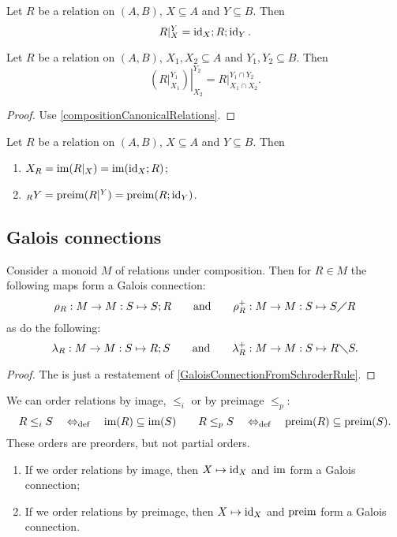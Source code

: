 \begin{lemma}
Let $R$ be a relation on $(A, B)$, $X\subseteq A$ and $Y \subseteq B$. Then
\[ R|^Y_X = \operatorname{id}_X;R;\operatorname{id}_Y. \]
\end{lemma}
\begin{corollary}
Let $R$ be a relation on $(A, B)$, $X_1,X_2\subseteq A$ and $Y_1,Y_2 \subseteq B$. Then
\[ \left.\left(R|_{X_1}^{Y_1}\right)\right|_{X_2}^{Y_2} = R|_{X_1\cap X_2}^{Y_1\cap Y_2}. \]
\end{corollary}
\begin{proof}
Use \ref{compositionCanonicalRelations}.
\end{proof} 

\begin{lemma}
Let $R$ be a relation on $(A,B)$, $X\subseteq A$ and $Y\subseteq B$. Then
\begin{enumerate}
\item $X_R = \operatorname{im}(R|_X) = \operatorname{im}(\operatorname{id}_X;R)$;
\item $_RY = \operatorname{preim}(R|^Y) = \operatorname{preim}(R;\operatorname{id}_Y)$.
\end{enumerate}
\end{lemma}

\subsection{Galois connections}
\begin{proposition}
Consider a monoid $M$ of relations under composition. Then for $R\in M$ the following maps form a Galois connection:
\[ \rho_R: M\to M: S \mapsto S;R \qquad\text{and}\qquad \rho_R^+: M\to M: S \mapsto S\diagup R \]
as do the following:
\[ \lambda_R: M\to M: S \mapsto R;S \qquad\text{and}\qquad \lambda_R^+: M\to M: S \mapsto R\diagdown S. \]
\end{proposition}
\begin{proof}
The is just a restatement of \ref{GaloisConnectionFromSchroderRule}.
\end{proof}

\begin{proposition}
We can order relations by image, $\leq_i$ or by preimage $\leq_p$:
\[ R \leq_i S \quad\Leftrightarrow_{\text{def}}\quad \operatorname{im}(R) \subseteq \operatorname{im}(S) \qquad R \leq_p S \quad\Leftrightarrow_{\text{def}}\quad \operatorname{preim}(R) \subseteq \operatorname{preim}(S). \]
These orders are preorders, but not partial orders.
\begin{enumerate}
\item If we order relations by image, then $X\mapsto \operatorname{id}_X$ and $\operatorname{im}$ form a Galois connection;
\item If we order relations by preimage, then $X\mapsto \operatorname{id}_X$ and $\operatorname{preim}$ form a Galois connection.
\end{enumerate}
\end{proposition}

